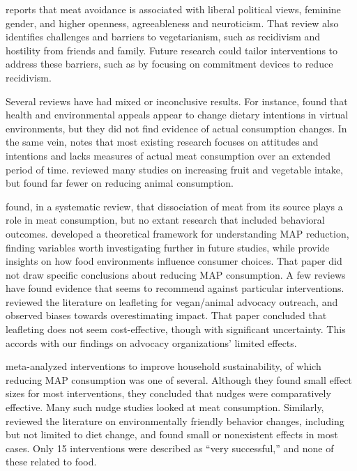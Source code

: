 \documentclass[sn-nature,referee,pdflatex]{sn-jnl}
\begin{document}
\citep{rosenfeld2018} reports that meat avoidance is associated with
liberal political views, feminine gender, and higher openness,
agreeableness and neuroticism. That review also identifies challenges
and barriers to vegetarianism, such as recidivism and hostility from
friends and family. Future research could tailor interventions to
address these barriers, such as by focusing on commitment devices to
reduce recidivism.

Several reviews have had mixed or inconclusive results. For instance,
\citep{bianchi2018conscious} found that health and environmental appeals
appear to change dietary intentions in virtual environments, but they
did not find evidence of actual consumption changes. In the same vein,
\citep{kwasny2022} notes that most existing research focuses on
attitudes and intentions and lacks measures of actual meat consumption
over an extended period of time. \citep{taufik2019} reviewed many
studies on increasing fruit and vegetable intake, but found far fewer on
reducing animal consumption.

\citep{benningstad2020} found, in a systematic review, that dissociation
of meat from its source plays a role in meat consumption, but no extant
research that included behavioral outcomes. \citep{graca2019} developed
a theoretical framework for understanding MAP reduction, finding
variables worth investigating further in future studies, while
\citep{pitt2017} provide insights on how food environments influence
consumer choices. That paper did not draw specific conclusions about
reducing MAP consumption. A few reviews have found evidence that seems
to recommend against particular interventions. \citep{greig2017}
reviewed the literature on leafleting for vegan/animal advocacy
outreach, and observed biases towards overestimating impact. That paper
concluded that leafleting does not seem cost-effective, though with
significant uncertainty. This accords with our findings on advocacy
organizations' limited effects.

\citep{nisa2019} meta-analyzed interventions to improve household
sustainability, of which reducing MAP consumption was one of several.
Although they found small effect sizes for most interventions, they
concluded that nudges were comparatively effective. Many such nudge
studies looked at meat consumption. Similarly, \citep{rau2022} reviewed
the literature on environmentally friendly behavior changes, including
but not limited to diet change, and found small or nonexistent effects
in most cases. Only 15 interventions were described as ``very
successful,'' and none of these related to food.
\end{document}
